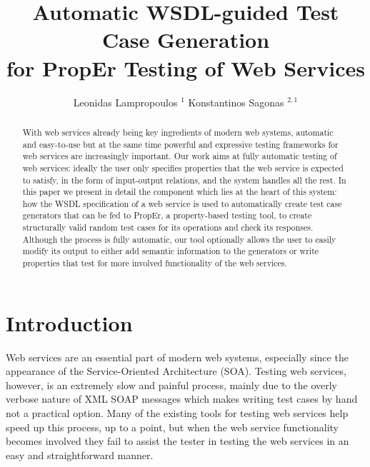 \documentclass[copyright]{eptcs}
\title{Automatic WSDL-guided Test Case Generation\\
       for PropEr Testing of Web Services}
\author{Leonidas Lampropoulos $^{1}$ \hspace*{2em} Konstantinos Sagonas $^{2,1}$
\institute{%
  $^{1}$ School of Electrical and Computer Engineering,
  National Technical University of Athens, Greece\\
  $^{2}$ Department of Information Technology, Uppsala University, Sweden
}
\email{$\{\,$leolamp$,\,$kostis$\,\}\,$@softlab.ntua.gr \hspace*{2em} kostis@it.uu.se}
}
\begin{document}
\maketitle

\begin{abstract}
With web services already being key ingredients of modern web systems,
automatic and easy-to-use but at the same time powerful and expressive
testing frameworks for web services are increasingly important. Our
work aims at fully automatic testing of web services: ideally the user
only specifies properties that the web service is expected to satisfy,
in the form of input-output relations, and the system handles all the
rest. In this paper we present in detail the component which lies at
the heart of this system: how the WSDL specification of a web service
is used to automatically create test case generators that can be fed
to PropEr, a property-based testing tool, to create structurally valid
random test cases for its operations and check its responses. Although
the process is fully automatic, our tool optionally allows the user to
easily modify its output to either add semantic information to the
generators or write properties that test for more involved
functionality of the web services.
\end{abstract}


\section{Introduction} \label{sec:intro}


Web services are an essential part of modern web systems, especially
since the appearance of the Service-Oriented Architecture (SOA).
Testing web services, however, is an extremely slow and painful
process, mainly due to the overly verbose nature of XML SOAP messages
which makes writing test cases by hand not a practical option. Many of
the existing tools for testing web services help speed up this
process, up to a point, but when the web service functionality becomes
involved they fail to assist the tester in testing the web services
in an easy and straightforward manner.

\end{document}
